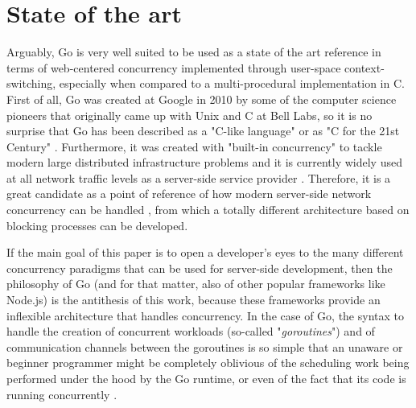 \section{State of the art}
Arguably, Go is very well suited to be used as a state of the art reference in terms of web-centered concurrency implemented through user-space context-switching, especially when compared to a multi-procedural implementation in C. First of all, Go was created at Google in 2010 by some of the computer science pioneers that originally came up with Unix and C at Bell Labs, so it is no surprise that Go has been described as a "C-like language" or as "C for the 21st Century" \cite{GoPL2015}. Furthermore, it was created with "built-in concurrency" to tackle modern large distributed infrastructure problems and it is currently widely used at all network traffic levels as a server-side service provider \cite{Pike2012}\cite{Ajmani2016}\cite{2022DataRacesGolang}. Therefore, it is a great candidate as a point of reference of how modern server-side network concurrency can be handled \cite{GoArticleACM}, from which a totally different architecture based on blocking processes can be developed. 

If the main goal of this paper is to open a developer's eyes to the many different concurrency paradigms that can be used for server-side development, then the philosophy of Go (and for that matter, also of other popular frameworks like Node.js) is the antithesis of this work, because these frameworks provide an inflexible architecture that handles concurrency. In the case of Go, the syntax to handle the creation of concurrent workloads (so-called "\textit{goroutines}") and of communication channels between the goroutines is so simple that an unaware or beginner programmer might be completely oblivious of the scheduling work being performed under the hood by the Go runtime, or even of the fact that its code is running concurrently \cite{2022DataRacesGolang}. 

